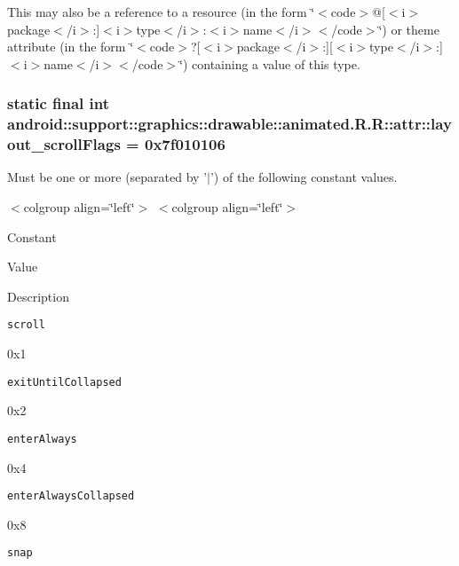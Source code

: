 This may also be a reference to a resource (in the form \char`\"{}$<$code$>$@\mbox{[}$<$i$>$package$<$/i$>$:\mbox{]}$<$i$>$type$<$/i$>$:$<$i$>$name$<$/i$>$$<$/code$>$\char`\"{}) or theme attribute (in the form \char`\"{}$<$code$>$?\mbox{[}$<$i$>$package$<$/i$>$:\mbox{]}\mbox{[}$<$i$>$type$<$/i$>$:\mbox{]}$<$i$>$name$<$/i$>$$<$/code$>$\char`\"{}) containing a value of this type. \hypertarget{classandroid_1_1support_1_1graphics_1_1drawable_1_1animated_1_1_r_1_1attr_9818a4245d70c10586906b76500dec8d}{
\subsubsection[{layout\_\-scrollFlags}]{\setlength{\rightskip}{0pt plus 5cm}static final int android::support::graphics::drawable::animated.R.R::attr::layout\_\-scrollFlags = 0x7f010106}}
\label{classandroid_1_1support_1_1graphics_1_1drawable_1_1animated_1_1_r_1_1attr_9818a4245d70c10586906b76500dec8d}


Must be one or more (separated by '$|$') of the following constant values. \begin{TabularC}{0}
\hline
\end{TabularC}
$<$colgroup align=\char`\"{}left\char`\"{}$>$ $<$colgroup align=\char`\"{}left\char`\"{}$>$ 

Constant

Value

Description 

{\tt scroll}

0x1

{\tt exitUntilCollapsed}

0x2

{\tt enterAlways}

0x4

{\tt enterAlwaysCollapsed}

0x8

{\tt snap}

